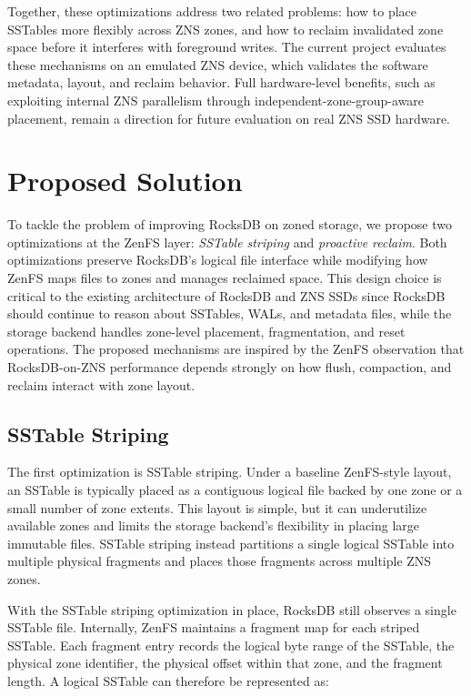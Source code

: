 \documentclass[letterpaper,twocolumn,10pt]{article}
\begin{document}
Together, these optimizations address two related problems: how to place SSTables more flexibly across ZNS zones, and how to reclaim invalidated zone space before it interferes with foreground writes. The current project evaluates these mechanisms on an emulated ZNS device, which validates the software metadata, layout, and reclaim behavior. Full hardware-level benefits, such as exploiting internal ZNS parallelism through independent-zone-group-aware placement, remain a direction for future evaluation on real ZNS SSD hardware.
\section{Proposed Solution}
\label{sec:solution}
To tackle the problem of improving RocksDB on zoned storage, we propose two optimizations at the ZenFS layer: \emph{SSTable striping} and \emph{proactive reclaim}. Both optimizations preserve RocksDB's logical file interface while modifying how ZenFS maps files to zones and manages reclaimed space. This design choice is critical to the existing architecture of RocksDB and ZNS SSDs since RocksDB should continue to reason about SSTables, WALs, and metadata files, while the storage backend handles zone-level placement, fragmentation, and reset operations. The proposed mechanisms are inspired by the ZenFS observation that RocksDB-on-ZNS performance depends strongly on how flush, compaction, and reclaim interact with zone layout. 

\subsection{SSTable Striping}
\label{subsec:sstable-striping}
The first optimization is SSTable striping. Under a baseline ZenFS-style layout, an SSTable is typically placed as a contiguous logical file backed by one zone or a small number of zone extents. This layout is simple, but it can underutilize available zones and limits the storage backend's flexibility in placing large immutable files. SSTable striping instead partitions a single logical SSTable into multiple physical fragments and places those fragments across multiple ZNS zones.

With the SSTable striping optimization in place, RocksDB still observes a single SSTable file. Internally, ZenFS maintains a fragment map for each striped SSTable. Each fragment entry records the logical byte range of the SSTable, the physical zone identifier, the physical offset within that zone, and the fragment length. A logical SSTable can therefore be represented as:
\end{document}
